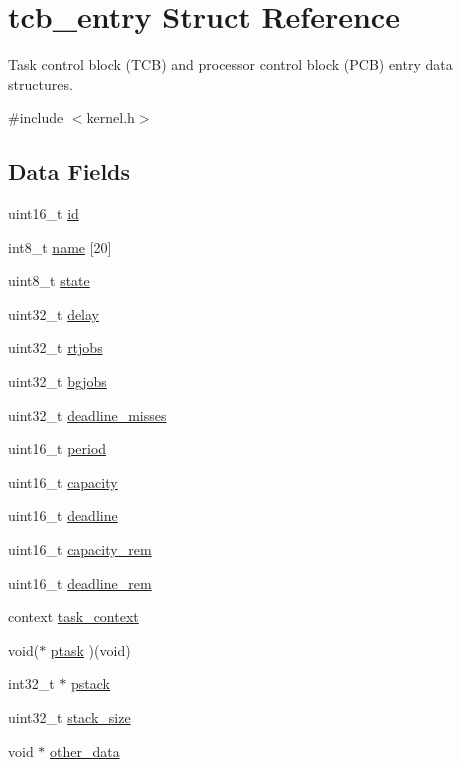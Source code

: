 \hypertarget{structtcb__entry}{\section{tcb\-\_\-entry Struct Reference}
\label{structtcb__entry}
}


Task control block (T\-C\-B) and processor control block (P\-C\-B) entry data structures.  




{\ttfamily \#include $<$kernel.\-h$>$}

\subsection*{Data Fields}
\begin{DoxyCompactItemize}
\item 
uint16\-\_\-t \hyperlink{structtcb__entry_ac06c8d6513b9d3031956b0efc2ab4871}{id}
\item 
int8\-\_\-t \hyperlink{structtcb__entry_ad7bfcb0f4b58b797af44f3a078abebff}{name} \mbox{[}20\mbox{]}
\item 
uint8\-\_\-t \hyperlink{structtcb__entry_a67f430ab50cb8ff9133e133fc240f3d7}{state}
\item 
uint32\-\_\-t \hyperlink{structtcb__entry_ab29fad6168f140493ddc8f860fadc3bc}{delay}
\item 
uint32\-\_\-t \hyperlink{structtcb__entry_a51802bc7ba3ee4cfcbcbfb404e606643}{rtjobs}
\item 
uint32\-\_\-t \hyperlink{structtcb__entry_a27631962295edabd283477b471f2d7ae}{bgjobs}
\item 
uint32\-\_\-t \hyperlink{structtcb__entry_a4594d17577feba0bd0825c8ef5e693db}{deadline\-\_\-misses}
\item 
uint16\-\_\-t \hyperlink{structtcb__entry_a85e14b4c040e0535b45b52a7ee7c9a94}{period}
\item 
uint16\-\_\-t \hyperlink{structtcb__entry_a2a3c8e5e81c910ccd845a8d1f58d550a}{capacity}
\item 
uint16\-\_\-t \hyperlink{structtcb__entry_a14ef4f38d7589e42ac7847b2bcc3443f}{deadline}
\item 
uint16\-\_\-t \hyperlink{structtcb__entry_a559dce8ac2982d3c8f46808ddc52bbb9}{capacity\-\_\-rem}
\item 
uint16\-\_\-t \hyperlink{structtcb__entry_af2ba0dde6c7ae71b6341714bf096cc80}{deadline\-\_\-rem}
\item 
context \hyperlink{structtcb__entry_a589e6c94b17a97df5d22edf504acfd42}{task\-\_\-context}
\item 
void($\ast$ \hyperlink{structtcb__entry_a7ed7f2d228da0039f065f0c8a756b46d}{ptask} )(void)
\item 
int32\-\_\-t $\ast$ \hyperlink{structtcb__entry_a0434be5f20d1645ab2804b7ee5c95fc9}{pstack}
\item 
uint32\-\_\-t \hyperlink{structtcb__entry_a2174ff4c5cf178e9dc3d652c472b23dd}{stack\-\_\-size}
\item 
void $\ast$ \hyperlink{structtcb__entry_accd675f017bb0ec5ae63b4d729bd73aa}{other\-\_\-data}
\end{DoxyCompactItemize}


